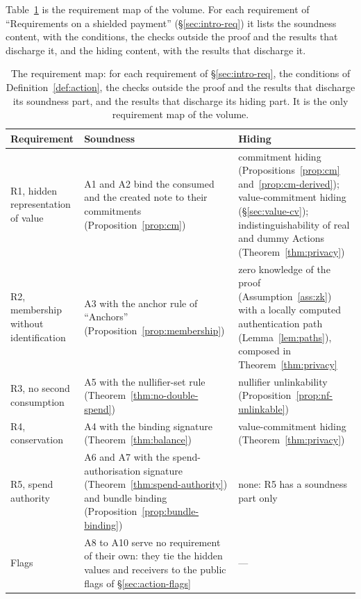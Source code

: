 \documentclass[11pt,a4paper]{article}
\theoremstyle{definition}
\begin{document}
Table~\ref{tab:action-req} is the requirement map of the volume. For each
requirement of ``Requirements on a shielded payment''
(\S\ref{sec:intro-req}) it lists the soundness content, with the conditions,
the checks outside the proof and the results that discharge it, and the
hiding content, with the results that discharge it.

\begin{table}[tp]
\centering\small
\setlength{\tabcolsep}{5pt}
\begin{tabular}{@{}p{2.2cm}p{5.8cm}p{5.2cm}@{}}
\toprule
Requirement & Soundness & Hiding \tabularnewline
\midrule
\raggedright R1, hidden representation of value
  & \raggedright A1 and A2 bind the consumed and the created note to their
    commitments (Proposition~\ref{prop:cm})
  & \raggedright commitment hiding (Propositions~\ref{prop:cm}
    and~\ref{prop:cm-derived}); value-commitment hiding
    (\S\ref{sec:value-cv}); indistinguishability of real and dummy Actions
    (Theorem~\ref{thm:privacy}) \tabularnewline
\addlinespace
\raggedright R2, membership without identification
  & \raggedright A3 with the anchor rule of ``Anchors''
    (Proposition~\ref{prop:membership})
  & \raggedright zero knowledge of the proof (Assumption~\ref{ass:zk}) with
    a locally computed authentication path (Lemma~\ref{lem:paths}),
    composed in Theorem~\ref{thm:privacy} \tabularnewline
\addlinespace
\raggedright R3, no second consumption
  & \raggedright A5 with the nullifier-set rule
    (Theorem~\ref{thm:no-double-spend})
  & \raggedright nullifier unlinkability
    (Proposition~\ref{prop:nf-unlinkable}) \tabularnewline
\addlinespace
\raggedright R4, conservation
  & \raggedright A4 with the binding signature (Theorem~\ref{thm:balance})
  & \raggedright value-commitment hiding (Theorem~\ref{thm:privacy})
    \tabularnewline
\addlinespace
\raggedright R5, spend authority
  & \raggedright A6 and A7 with the spend-authorisation signature
    (Theorem~\ref{thm:spend-authority}) and bundle binding
    (Proposition~\ref{prop:bundle-binding})
  & \raggedright none: R5 has a soundness part only \tabularnewline
\midrule
\raggedright Flags
  & \raggedright A8 to A10 serve no requirement of their own: they tie the
    hidden values and receivers to the public flags of
    \S\ref{sec:action-flags}
  & --- \tabularnewline
\bottomrule
\end{tabular}
\caption{The requirement map: for each requirement of
\S\ref{sec:intro-req}, the conditions of Definition~\ref{def:action}, the
checks outside the proof and the results that discharge its soundness part,
and the results that discharge its hiding part. It is the only requirement
map of the volume.}
\label{tab:action-req}
\end{table}
\end{document}
